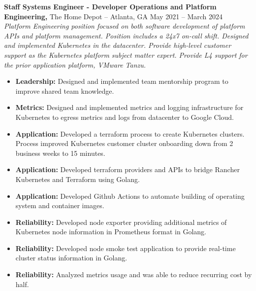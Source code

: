 \documentclass[11pt]{article}       %
\begin{document}
\textbf{Staff Systems Engineer - Developer Operations and Platform Engineering,} {The Home Depot} -- Atlanta, GA \hfill May 2021 -- March 2024 \\
\vspace{-9pt}
\textit{Platform Engineering position focused on both software development of platform APIs and platform management. Position includes a 24x7 on-call shift. Designed and implemented Kubernetes in the datacenter. Provide high-level customer support as the Kubernetes platform subject matter expert. Provide L4 support for the prior application platform, VMware Tanzu. }
\vspace{-4pt}
\begin{itemize}
  \item \textbf{Leadership:} Designed and implemented team mentorship program to improve shared team knowledge.
  \item \textbf{Metrics:} Designed and implemented metrics and logging infrastructure for Kubernetes to egress metrics and logs from datacenter to Google Cloud.
  \item \textbf{Application:} Developed a terraform process to create Kubernetes clusters. Process improved Kubernetes customer cluster onboarding down from 2 business weeks to 15 minutes.
  \item \textbf{Application:} Developed terraform providers and APIs to bridge Rancher Kubernetes and Terraform using Golang.
  \item \textbf{Application:} Developed Github Actions to automate building of operating system and container images.
  \item \textbf{Reliability:} Developed node exporter providing additional metrics of Kubernetes node information in Prometheus format in Golang.
  \item \textbf{Reliability:} Developed node smoke test application to provide real-time cluster status information in Golang.
  \item \textbf{Reliability:} Analyzed metrics usage and was able to reduce recurring cost by half.
\end{itemize}
\end{document}
